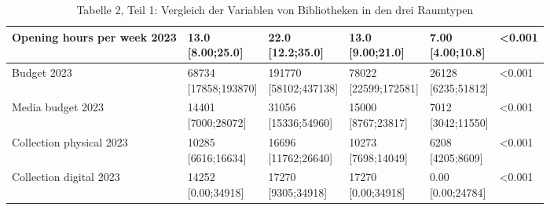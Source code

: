 \documentclass[a4paper,
fontsize=11pt,
oneside,
numbers=noperiodatend,
parskip=half-,
bibliography=totoc,
final
]{scrartcl}
\begin{document}
\begin{landscape}
\begin{table}[]
\begin{tabular}{|l|l|l|l|l|l|}
Opening hours per week 2023      & \makecell{ 13.0 \\ {[}8.00;25.0{]}}     & \makecell{ 22.0 \\ {[}12.2;35.0{]}}      & \makecell{ 13.0 \\ {[}9.00;21.0{]}}     & \makecell{ 7.00 \\ {[}4.00;10.8{]}}   & \textless{}0.001   \\ \hline
Budget 2023                      & \makecell{ 68734 \\ {[}17858;193870{]}} & \makecell{ 191770 \\ {[}58102;437138{]}} & \makecell{ 78022 \\ {[}22599;172581{]}} & \makecell{ 26128 \\ {[}6235;51812{]}} & \textless{}0.001   \\ \hline
Media budget 2023                & \makecell{ 14401 \\ {[}7000;28072{]}}   & \makecell{ 31056 \\ {[}15336;54960{]}}   & \makecell{ 15000 \\ {[}8767;23817{]}}   & \makecell{ 7012 \\ {[}3042;11550{]}}  & \textless{}0.001   \\ \hline
Collection physical 2023         & \makecell{ 10285 \\ {[}6616;16634{]}}   & \makecell{ 16696 \\ {[}11762;26640{]}}   & \makecell{ 10273 \\ {[}7698;14049{]}}   & \makecell{ 6208 \\ {[}4205;8609{]}}   & \textless{}0.001   \\ \hline
Collection digital 2023          & \makecell{ 14252 \\ {[}0.00;34918{]}}   & \makecell{ 17270 \\ {[}9305;34918{]}}    & \makecell{ 17270 \\ {[}0.00;34918{]}}   & \makecell{ 0.00 \\ {[}0.00;24784{]}}  & \textless{}0.001   \\ \hline
\end{tabular}
\caption{Tabelle 2, Teil 1: Vergleich der Variablen von Bibliotheken in den drei Raumtypen}
\end{table}
\end{landscape}
\end{document}
